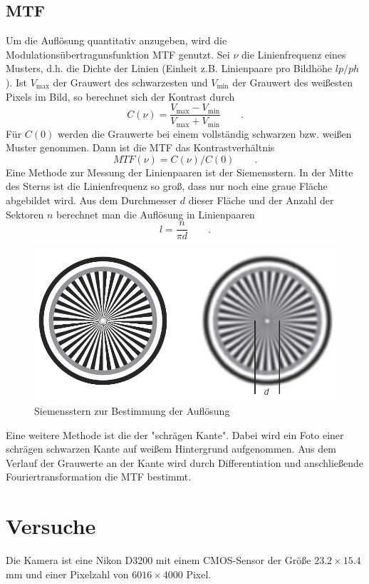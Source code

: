 \subsection{MTF}
Um die Auflösung quantitativ anzugeben, wird die Modulationsübertragunsfunktion MTF genutzt. Sei $\nu$ die Linienfrequenz eines Musters, d.h. die Dichte der Linien (Einheit z.B. Linienpaare pro Bildhöhe $lp/ph$). Ist $V_{\text{max}}$ der Grauwert des schwarzesten und $V_{\text{min}}$ der Grauwert des weißesten Pixels im Bild, so berechnet sich der Kontrast durch
\begin{equation}
	C(\nu)=\frac{V_{\text{max}}-V_{\text{min}}}{V_{\text{max}}+V_{\text{min}}}\qquad .
\label{eq:kontrast}
\end{equation}
Für $C(0)$ werden die Grauwerte bei einem vollständig schwarzen bzw. weißen Muster genommen. Dann ist die MTF das Kontrastverhältnis
\begin{equation}
	MTF(\nu)=C(\nu)/C(0)\qquad .
\label{eq:mtf}
\end{equation}
Eine Methode zur Messung der Linienpaaren ist der Siemensstern. In der Mitte des Sterns ist die Linienfrequenz so groß, dass nur noch eine graue Fläche abgebildet wird. Aus dem Durchmesser $d$ dieser Fläche und der Anzahl der Sektoren $n$ berechnet man die Auflösung in Linienpaaren
\begin{equation}
	l=\frac{n}{\pi d}\qquad .
\label{eq:siemens}
\end{equation}
\begin{figure}[h]
  \centering
  \includegraphics[width=.5\textwidth]{res/siemens}
  \caption{Siemensstern zur Bestimmung der Auflösung}
  \label{fig:siemens}
\end{figure}
Eine weitere Methode ist die der "schrägen Kante". Dabei wird ein Foto einer schrägen schwarzen Kante auf weißem Hintergrund aufgenommen. Aus dem Verlauf der Grauwerte an der Kante wird durch Differentiation und anschließende Fouriertransformation die MTF bestimmt.

\section{Versuche}
Die Kamera ist eine Nikon D3200 mit einem CMOS-Sensor der Größe $23.2 \times 15.4$ mm und einer Pixelzahl von $6016 \times 4000$ Pixel.
